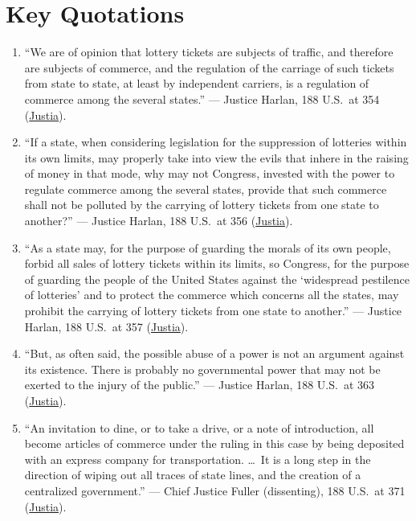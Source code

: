 \documentclass[12pt]{article}
\begin{document}
\section{Key Quotations}
\begin{enumerate}
  \item ``We are of opinion that lottery tickets are subjects of traffic, and therefore are subjects of commerce, and the regulation of the carriage of such tickets from state to state, at least by independent carriers, is a regulation of commerce among the several states.'' --- Justice Harlan, 188 U.S.\ at 354 (\href{https://supreme.justia.com/cases/federal/us/188/321/}{Justia}).
  \item ``If a state, when considering legislation for the suppression of lotteries within its own limits, may properly take into view the evils that inhere in the raising of money in that mode, why may not Congress, invested with the power to regulate commerce among the several states, provide that such commerce shall not be polluted by the carrying of lottery tickets from one state to another?'' --- Justice Harlan, 188 U.S.\ at 356 (\href{https://supreme.justia.com/cases/federal/us/188/321/}{Justia}).
  \item ``As a state may, for the purpose of guarding the morals of its own people, forbid all sales of lottery tickets within its limits, so Congress, for the purpose of guarding the people of the United States against the `widespread pestilence of lotteries' and to protect the commerce which concerns all the states, may prohibit the carrying of lottery tickets from one state to another.'' --- Justice Harlan, 188 U.S.\ at 357 (\href{https://supreme.justia.com/cases/federal/us/188/321/}{Justia}).
  \item ``But, as often said, the possible abuse of a power is not an argument against its existence. There is probably no governmental power that may not be exerted to the injury of the public.'' --- Justice Harlan, 188 U.S.\ at 363 (\href{https://supreme.justia.com/cases/federal/us/188/321/}{Justia}).
  \item ``An invitation to dine, or to take a drive, or a note of introduction, all become articles of commerce under the ruling in this case by being deposited with an express company for transportation. \dots\ It is a long step in the direction of wiping out all traces of state lines, and the creation of a centralized government.'' --- Chief Justice Fuller (dissenting), 188 U.S.\ at 371 (\href{https://supreme.justia.com/cases/federal/us/188/321/}{Justia}).
\end{enumerate}
\end{document}

